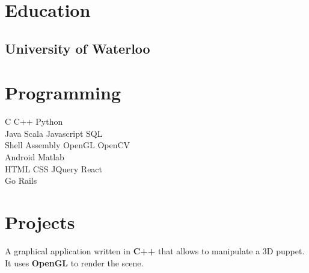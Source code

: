 \documentclass[]{deedy-resume-openfont}
\begin{document}
%
%

%
%

\begin{minipage}[t]{0.33\textwidth} 


\section{Education} 

\subsection{University of Waterloo}
\sectionsep


\section{Programming}
C \textbullet{} C++ \textbullet{} Python \\
Java \textbullet{} Scala \textbullet{} Javascript \textbullet{} SQL \\
Shell \textbullet{} Assembly \textbullet{} OpenGL \textbullet{} OpenCV \\
Android \textbullet{} Matlab\\
HTML \textbullet{} CSS \textbullet{} JQuery \textbullet{} React \\
Go \textbullet{} Rails
\sectionsep


\section{Projects}
A graphical application written in \textbf{C++} that allows to manipulate a 3D puppet. It uses
\textbf{OpenGL} to render the scene.
\sectionsep


\end{minipage}
\end{document}
